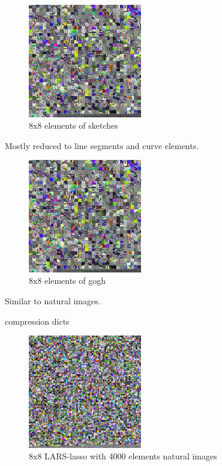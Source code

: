\begin{figure}
\centering
\includegraphics[width = 0.44\textwidth]{images/16_1000_1000_10_lasso.png}
\caption{8x8 elements of sketches}
\label{fig:16_1000_lasso}
\end{figure}

Mostly reduced to line segments and curve elements.

\begin{figure}
\centering
\includegraphics[width = 0.44\textwidth]{images/16_1000_1000_10_lasso.png}
\caption{8x8 elements of gogh}
\label{fig:16_1000_lasso}
\end{figure}

Similar to natural images.


compression dicts

\begin{figure}
\centering
\includegraphics[width = 0.44\textwidth]{images/8_4000_10000_10_lasso.png} 
\caption{8x8 LARS-lasso with 4000 elements natural images}
\label{fig:8_4000_lasso}
\end{figure}

